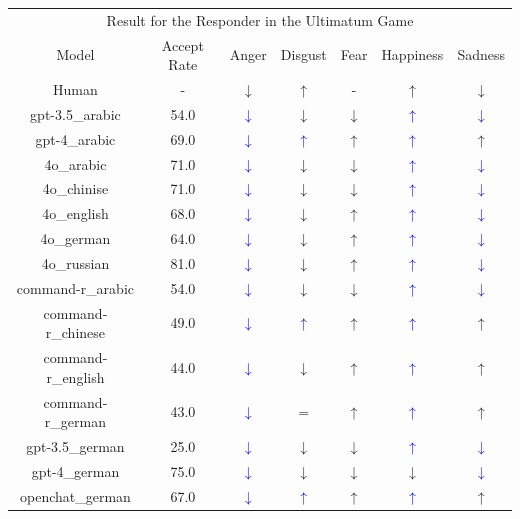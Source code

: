 \documentclass{article}
\newcommand{\bluearrow}[1]{\textcolor{blue}{#1}}
\begin{document}
\begin{table}
\begin{tabular}{ccccccc}
         \hline
        \multicolumn{7}{c}{Result for the Responder in the Ultimatum Game} \\
         Model & Accept Rate & Anger & Disgust & Fear & Happiness & Sadness \\

Human        & -  & $\downarrow$ & $\uparrow$ & -  & $\uparrow$ & $\downarrow$ \\
gpt-3.5\_arabic & 54.0 & \bluearrow{$\downarrow$} & $\downarrow$ & $\downarrow$ & \bluearrow{$\uparrow$} & \bluearrow{$\downarrow $}\\
gpt-4\_arabic & 69.0 & \bluearrow{$\downarrow$} & \bluearrow{$\uparrow$} & $\uparrow$ & \bluearrow{$\uparrow$} & $\uparrow $\\
4o\_arabic & 71.0 & \bluearrow{$\downarrow$} & $\downarrow$ & $\downarrow$ & \bluearrow{$\uparrow$} & \bluearrow{$\downarrow $}\\
4o\_chinise & 71.0 & \bluearrow{$\downarrow$} & $\downarrow$ & $\downarrow$ & \bluearrow{$\uparrow$} & \bluearrow{$\downarrow $}\\
4o\_english & 68.0 & \bluearrow{$\downarrow$} & $\downarrow$ & $\uparrow$ & \bluearrow{$\uparrow$} & \bluearrow{$\downarrow $}\\
4o\_german & 64.0 & \bluearrow{$\downarrow$} & $\downarrow$ & $\uparrow$ & \bluearrow{$\uparrow$} & \bluearrow{$\downarrow $}\\
4o\_russian & 81.0 & \bluearrow{$\downarrow$} & $\downarrow$ & $\uparrow$ & \bluearrow{$\uparrow$} & \bluearrow{$\downarrow $}\\
command-r\_arabic & 54.0 & \bluearrow{$\downarrow$} & $\downarrow$ & $\downarrow$ & \bluearrow{$\uparrow$} & \bluearrow{$\downarrow $}\\
command-r\_chinese & 49.0 & \bluearrow{$\downarrow$} & \bluearrow{$\uparrow$} & $\uparrow$ & \bluearrow{$\uparrow$} & $\uparrow $\\
command-r\_english & 44.0 & \bluearrow{$\downarrow$} & $\downarrow$ & $\uparrow$ & \bluearrow{$\uparrow$} & $\uparrow $\\
command-r\_german & 43.0 & \bluearrow{$\downarrow$} & $=$ & $\uparrow$ & \bluearrow{$\uparrow$} & $\uparrow $\\
gpt-3.5\_german & 25.0 & \bluearrow{$\downarrow$} & $\downarrow$ & $\downarrow$ & \bluearrow{$\uparrow$} & \bluearrow{$\downarrow $}\\
gpt-4\_german & 75.0 & \bluearrow{$\downarrow$} & $\downarrow$ & $\downarrow$ & $\downarrow$ & \bluearrow{$\downarrow $}\\
openchat\_german & 67.0 & \bluearrow{$\downarrow$} & \bluearrow{$\uparrow$} & $\uparrow$ & \bluearrow{$\uparrow$} & $\uparrow $\\
         \hline
    \end{tabular}
\end{table}
\end{document}
